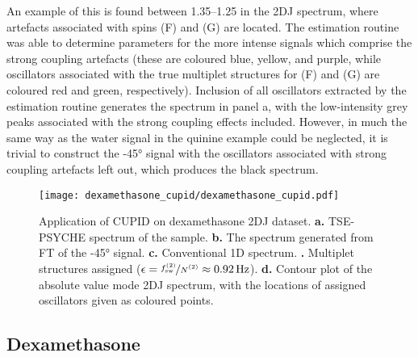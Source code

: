 An example of this is found between \SIrange{1.35}{1.25}{\partspermillion} in
the \ac{2DJ} spectrum, where artefacts associated with spins (F) and (G) are
located.
The estimation routine was able to determine parameters for
the more intense signals which comprise the strong coupling artefacts (these
are coloured blue, yellow, and purple, while oscillators associated with the
true multiplet structures for (F) and (G) are coloured red and green, respectively).
Inclusion of all oscillators extracted by the estimation routine generates the
spectrum in panel a, with the low-intensity grey peaks associated with the strong
coupling effects included. However, in much the same way as the water signal in
the quinine example could be neglected, it is trivial to construct the \ang{-45}
signal with the oscillators associated with strong coupling artefacts left out,
which produces the black spectrum.

\begin{sidewaysfigure}%
    \centering%
    \texttt{[image: dexamethasone\_cupid/dexamethasone\_cupid.pdf]}%
    \caption[
        Application of \acs{CUPID} on a dexamethasone dataset.
    ]{
        Application of \acs{CUPID} on dexamethasone \ac{2DJ} dataset.
        \textbf{a.} \acs{TSE-PSYCHE} spectrum of the sample.
        \textbf{b.} The spectrum generated from \ac{FT} of the \ang{-45}
        signal.
        \textbf{c.} Conventional \acs{1D} spectrum.
        \textbf{.} Multiplet structures assigned ($\epsilon =
        \nicefrac{\fswtwo}{\Ntwo} \approx \qty{0.92}{\hertz}$).
        \textbf{d.} Contour plot of the absolute value mode \acs{2DJ} spectrum,
        with the locations of assigned oscillators given as coloured points.
    }
    \label{fig:dexamethasone-cupid}%
\end{sidewaysfigure}%

\subsection{Dexamethasone}


